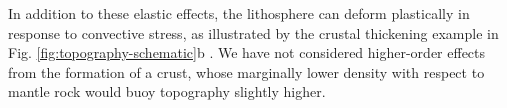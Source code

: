 In addition to these elastic effects, %
the lithosphere can deform plastically in response to convective stress, as illustrated by the crustal thickening example in Fig. \ref{fig:topography-schematic}b \citep{kiefer_mantle_1991,pysklywec_timedependent_2003, zampa_evidence_2018}. We have not considered higher-order effects from the formation of a crust, whose marginally lower density with respect to mantle rock would buoy topography slightly higher.






